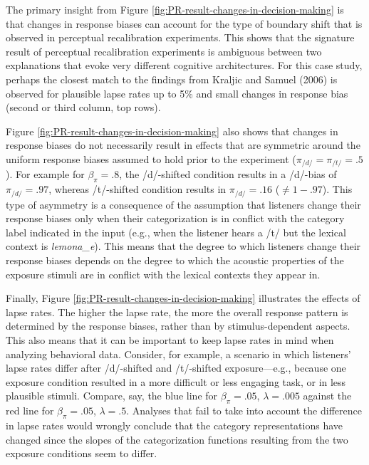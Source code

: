 \documentclass[
  11pt,
  english,
  man,floatsintext]{apa6}
\begin{document}
The primary insight from Figure \ref{fig:PR-result-changes-in-decision-making} is that changes in response biases can account for the type of boundary shift that is observed in perceptual recalibration experiments. This shows that the signature result of perceptual recalibration experiments is ambiguous between two explanations that evoke very different cognitive architectures. For this case study, perhaps the closest match to the findings from Kraljic and Samuel (2006) is observed for plausible lapse rates up to 5\% and small changes in response bias (second or third column, top rows).

Figure \ref{fig:PR-result-changes-in-decision-making} also shows that changes in response biases do not necessarily result in effects that are symmetric around the uniform response biases assumed to hold prior to the experiment (\(\pi_{/d/}=\pi_{/t/}=.5\)). For example for \(\beta_{\pi} = .8\), the /d/-shifted condition results in a /d/-bias of \(\pi_{/d/}=.97\), whereas /t/-shifted condition results in \(\pi_{/d/}=.16\) (\(\neq 1 - .97\)). This type of asymmetry is a consequence of the assumption that listeners change their response biases only when their categorization is in conflict with the category label indicated in the input (e.g., when the listener hears a /t/ but the lexical context is \emph{lemona\_e}). This means that the degree to which listeners change their response biases depends on the degree to which the acoustic properties of the exposure stimuli are in conflict with the lexical contexts they appear in.

Finally, Figure \ref{fig:PR-result-changes-in-decision-making} illustrates the effects of lapse rates. The higher the lapse rate, the more the overall response pattern is determined by the response biases, rather than by stimulus-dependent aspects. This also means that it can be important to keep lapse rates in mind when analyzing behavioral data. Consider, for example, a scenario in which listeners' lapse rates differ after /d/-shifted and /t/-shifted exposure---e.g., because one exposure condition resulted in a more difficult or less engaging task, or in less plausible stimuli. Compare, say, the blue line for \(\beta_{\pi} = .05\), \(\lambda = .005\) against the red line for \(\beta_{\pi} = .05\), \(\lambda = .5\). Analyses that fail to take into account the difference in lapse rates would wrongly conclude that the category representations have changed since the slopes of the categorization functions resulting from the two exposure conditions seem to differ.
\end{document}
